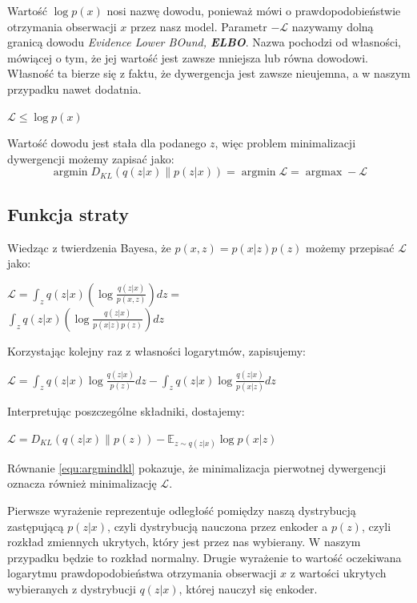 \documentclass[a4paper,12pt,oneside]{book} %
\begin{document}
Wartość $\log p(x)$ nosi nazwę dowodu, ponieważ mówi o prawdopodobieństwie otrzymania obserwacji $x$ przez nasz model.
Parametr $-\mathcal{L}$ nazywamy dolną granicą dowodu \textit{Evidence Lower BOund, \textbf{ELBO}}. Nazwa pochodzi od własności, mówiącej o tym, że jej wartość jest zawsze mniejsza lub równa dowodowi. Własność ta bierze się z faktu, że 
dywergencja jest zawsze nieujemna, a w naszym przypadku nawet dodatnia. 
\begin{center}
	$\mathcal{L}\leq\log p(x)$
\end{center}
Wartość dowodu jest stała dla podanego $z$, więc problem minimalizacji dywergencji możemy zapisać jako:
\begin{equation}
	\operatorname*{argmin}D_{KL}(q(z|x)\|p(z|x)) = \operatorname*{argmin}\mathcal{L} = \operatorname*{argmax}-\mathcal{L}
	\label{equ:argmindkl}
\end{equation}
\subsection{Funkcja straty}
Wiedząc z twierdzenia Bayesa, że $p(x,z) = p(x|z)p(z)$ możemy przepisać $\mathcal{L}$ jako:
\begin{center}
	$\mathcal{L}=\displaystyle\int_{z}^{}q(z|x)\left( \log\frac{q(z|x)}{p(x,z)}\right)dz=$\\
	$\displaystyle\int_{z}^{}q(z|x)\left( \log\frac{q(z|x)}{p(x|z)p(z)}\right)dz$
\end{center}
Korzystając kolejny raz z własności logarytmów, zapisujemy:
\begin{center}
	$\mathcal{L}=\displaystyle\int_{z}^{}q(z|x)\log\frac{q(z|x)}{p(z)}dz - \displaystyle\int_{z}^{}q(z|x)\log\frac{q(z|x)}{p(x|z)}dz$
\end{center}
Interpretując poszczególne składniki, dostajemy:
\begin{center}
	$\mathcal{L} =  D_{KL}(q(z|x)\|p(z)) - \mathbb{E}_{z\sim q(z|x)}\log p(x|z)$
\end{center}
Równanie \ref{equ:argmindkl} pokazuje, że minimalizacja pierwotnej dywergencji oznacza również minimalizację $\mathcal{L}$. 

Pierwsze wyrażenie reprezentuje odległość pomiędzy naszą dystrybucją zastępującą $p(z|x)$, czyli dystrybucją nauczona przez enkoder a $p(z)$, czyli rozkład zmiennych ukrytych, który jest przez nas wybierany. W naszym przypadku będzie to rozkład normalny. Drugie wyrażenie to wartość oczekiwana logarytmu prawdopodobieństwa otrzymania obserwacji $x$ z wartości ukrytych wybieranych z dystrybucji $q(z|x)$, której nauczył się enkoder.
\end{document}
